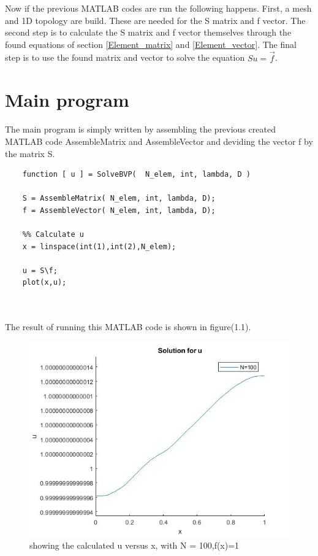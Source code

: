 \documentclass[a4paper]{report}
\begin{document}
Now if the previous MATLAB codes are run the following happens. First, a mesh and 1D topology are build. These are needed for the S matrix and f vector. The second step is to calculate the S matrix and f vector themselves through the found equations of section \ref{Element_matrix} and \ref{Element_vector}. The final step is to use the found matrix and vector to solve the equation $Su=\vec{f}$.





\section{Main program}

The main program is simply written by assembling the previous created MATLAB code AssembleMatrix and AssembleVector and deviding the vector f by the matrix S.
\begin{lstlisting}
	function [ u ] = SolveBVP(  N_elem, int, lambda, D )
	
	S = AssembleMatrix( N_elem, int, lambda, D);
	f = AssembleVector( N_elem, int, lambda, D);
	
	%% Calculate u
	x = linspace(int(1),int(2),N_elem);
	
	u = S\f;
	plot(x,u); 
	
	
\end{lstlisting}
The result of running this MATLAB code is shown in figure(1.1).

\begin{figure}[ht!]
	\centering
	\includegraphics[width=150mm]{1Df1.jpg}
	\caption{showing the calculated u versus x, with N = 100,f(x)=1 \label{overflow}}
\end{figure}
\newpage
\end{document}
